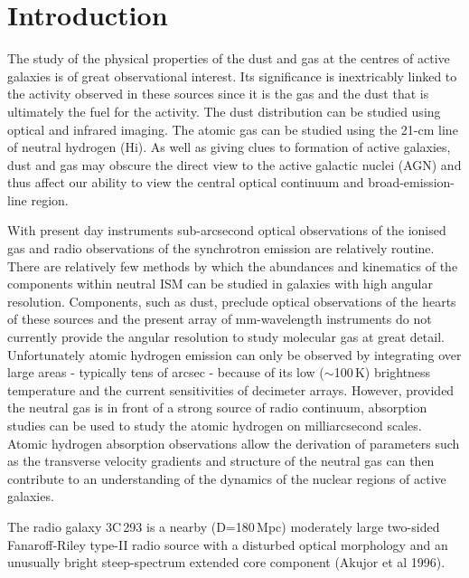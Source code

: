 \documentclass{evn2004}
\begin{document}
   \maketitle
%

\section{Introduction}

The study of the physical properties of the dust and gas at the
centres of active galaxies is of great observational interest. Its
significance is inextricably linked to the activity observed in these
sources since it is the gas and the dust that is ultimately the fuel
for the activity.   The dust
distribution can be studied using optical
and infrared imaging. The atomic gas can be studied using the 21-cm
line of neutral hydrogen (H{\sc i}). As well as giving clues to formation of
active galaxies, dust and gas may obscure the direct view to the
active galactic nuclei (AGN) and thus affect our ability to view the
central optical continuum and broad-emission-line region. 

With present day instruments sub-arcsecond
optical observations of the ionised gas and radio observations of the
synchrotron emission are relatively routine. There are relatively few methods by which the abundances
and kinematics of the components within neutral ISM can be studied in
galaxies with high angular resolution.  Components, such as dust, preclude
optical observations of the hearts of these sources and the present
array of mm-wavelength instruments do not currently provide the
angular resolution to study molecular gas at great detail.  Unfortunately atomic
hydrogen emission can only be observed by integrating over large
areas - typically tens of arcsec - because of its low ($\sim$100\,K)
brightness temperature and the current sensitivities of decimeter
arrays. However, provided the neutral gas is in front of a strong
source of radio continuum, absorption studies can be used to study the
atomic hydrogen on milliarcsecond scales. Atomic hydrogen absorption observations allow the derivation of parameters such as the transverse velocity gradients and structure of the neutral gas can then contribute to an understanding of the dynamics of the nuclear regions of active galaxies.

The radio galaxy 3C\,293 is a nearby (D=180\,Mpc) moderately large
two-sided Fanaroff-Riley type-II radio source with a disturbed optical
morphology and an unusually bright steep-spectrum extended core
component (Akujor et al 1996). 
\end{document}
